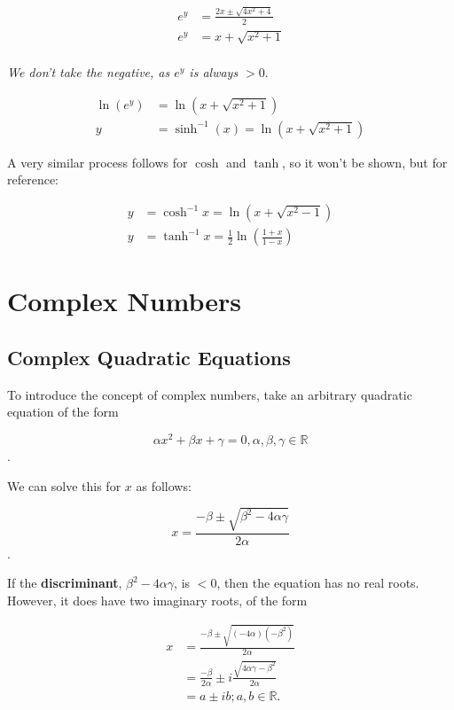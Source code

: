 \documentclass[12pt]{article}
\begin{document}
\begin{equation}
    \begin{split}
        e^y &= \frac{2x \pm \sqrt{4x^2+4}}{2}\\
        e^y &= x + \sqrt{x^2+1}\\
    \end{split}
\end{equation}

\textit{We don't take the negative, as $e^y$ is always $>0$}.

\begin{equation}
    \begin{split}
        \ln(e^y) &= \ln(x+\sqrt{x^2+1})\\
        y &= \sinh^{-1}(x) = \ln(x+\sqrt{x^2+1})
    \end{split}
\end{equation}

A very similar process follows for $\cosh$ and $\tanh$, so it won't be shown, but for reference:

\begin{equation}
    \begin{split}
        y &= \cosh^{-1}x = \ln(x+\sqrt{x^2-1})\\
        y &= \tanh^{-1}x = \frac{1}{2} \ln(\frac{1+x}{1-x})
    \end{split}
\end{equation}

\section{Complex Numbers}\label{complex}
\subsection{Complex Quadratic Equations}
To introduce the concept of complex numbers, take an arbitrary quadratic equation of the form 

$$\alpha x^2 + \beta x + \gamma = 0, \alpha, \beta, \gamma \in \mathbb{R}$$.

We can solve this for $x$ as follows:

$$x = \frac{-\beta \pm \sqrt{\beta^2-4\alpha\gamma}}{2\alpha}$$.

If the \textbf{discriminant}, $\beta^2-4\alpha\gamma$, is $<0$, then the equation has no real roots. However, it does have two imaginary roots, of the form

\begin{equation}
    \begin{split}
        x &= \frac{-\beta \pm \sqrt{(-4\alpha)(-\beta^2)}}{2\alpha}\\
        &= \frac{-\beta}{2\alpha} \pm i \frac{\sqrt{4 \alpha \gamma - \beta^2}}{2 \alpha}\\
        &= a \pm  ib; a,b \in \mathbb{R}.
    \end{split}
\end{equation}
\end{document}
